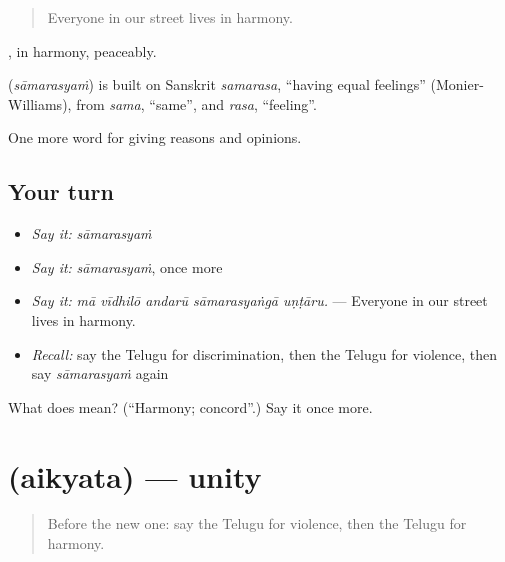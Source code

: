 \begin{quote}
Everyone in our street lives in harmony.
\end{quote}

, in harmony, peaceably.

\begin{cousinweb}
\textbf{} (\emph{sāmarasyaṁ}) is built on Sanskrit \emph{samarasa}, \textquotedblleft{}having equal feelings\textquotedblright{} (Monier-Williams), from \emph{sama}, \textquotedblleft{}same\textquotedblright{}, and \emph{rasa}, \textquotedblleft{}feeling\textquotedblright{}.
\end{cousinweb}

\begin{grammarlens}[title={What you've built}]
One more word for giving reasons and opinions.
\end{grammarlens}

\subsection*{Your turn}
\begin{itemize}
\raggedright
  \item \emph{Say it:} \emph{sāmarasyaṁ}
  \item \emph{Say it:} \emph{sāmarasyaṁ}, once more
  \item \emph{Say it:} \emph{mā vīdhilō andarū sāmarasyaṅgā uṇṭāru.} — Everyone in our street lives in harmony.
  \item \emph{Recall:} say the Telugu for discrimination, then the Telugu for violence, then say \emph{sāmarasyaṁ} again
\end{itemize}

\begin{tcolorbox}[breakable,colback=teal!4,colframe=teal!35!black,title={Before you move on}]
What does  mean? (\textquotedblleft{}Harmony; concord\textquotedblright{}.) Say it once more.
\end{tcolorbox}
\section[\texorpdfstring{\te{ఐక్యత} (aikyata)}{ఐక్యత (aikyata)}]{ (aikyata) — unity}

\label{lesson:TE-C409-aikyata}



\begin{quote}
Before the new one: say the Telugu for violence, then the Telugu for harmony.
\end{quote}

